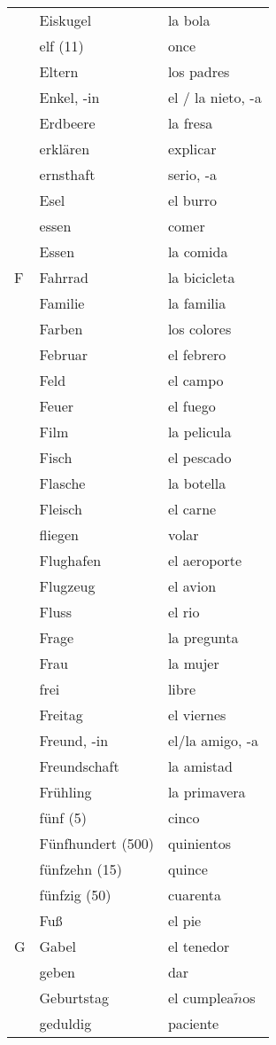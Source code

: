 \documentclass[10pt,spanish]{article}
\begin{document}
\begin{longtable}{p{} p{} | p{}}
& Eiskugel & la bola  \\
& elf (11) & once  \\
& Eltern & los padres  \\
& Enkel, -in & el / la nieto, -a  \\
& Erdbeere & la fresa  \\
& erklären & explicar  \\
& ernsthaft & serio, -a\\
& Esel & el burro  \\
& essen & comer \\
& Essen & la comida \\
F & Fahrrad & la bicicleta \\
& Familie & la familia   \\
& Farben & los colores  \\
& Februar & el febrero  \\
& Feld & el campo  \\
& Feuer & el fuego  \\
& Film & la pelicula  \\
& Fisch & el pescado \\
& Flasche & la botella  \\
& Fleisch & el carne \\
& fliegen & volar \\
& Flughafen & el aeroporte \\
& Flugzeug & el avion  \\
& Fluss & el rio  \\
& Frage & la pregunta \\
& Frau & la mujer  \\
& frei & libre  \\
& Freitag & el viernes \\
& Freund, -in & el/la amigo, -a  \\
& Freundschaft & la amistad  \\
& Frühling & la primavera  \\
& fünf (5) & cinco  \\
& Fünfhundert (500) & quinientos \\
& fünfzehn (15) & quince  \\
& fünfzig (50) & cuarenta \\
& Fuß & el pie  \\
G & Gabel & el tenedor  \\
& geben & dar  \\
& Geburtstag & el cumplea$\tilde{n}$os  \\
& geduldig & paciente \\

\end{longtable}
\end{document}
